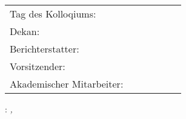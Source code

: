 \thispagestyle{empty}

\hfill
\vfill

\noindent
\begin{tabular}{ l | r}
 Tag des Kolloqiums: & \\
 Dekan: &  \\  
 Berichterstatter: & \\    
 Vorsitzender: & \\
	Akademischer Mitarbeiter:~~~~~~~~~&\\
\end{tabular}
\vspace{1cm}

\begin{changemargin}{0mm}{-1cm}
\noindent\myName: \textit{\myTitle,}\\%
\textcopyright\ \myTime
\end{changemargin}

%
%
%
%
%
